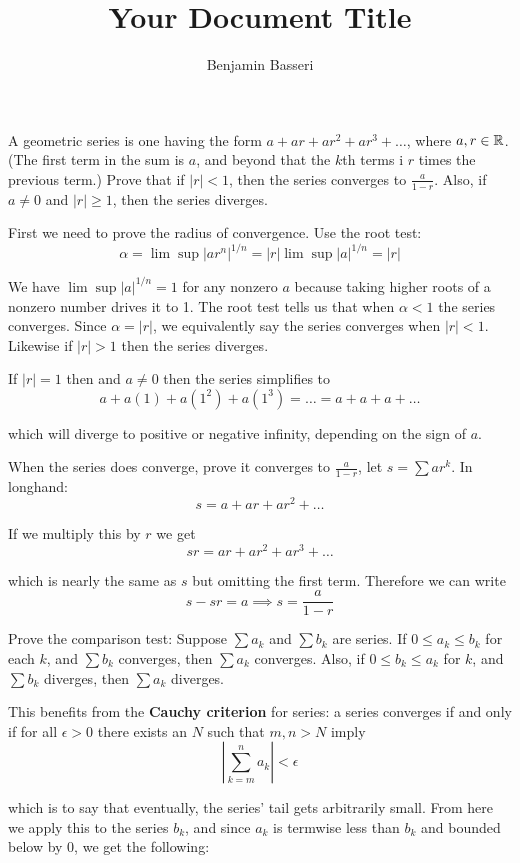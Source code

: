 \documentclass{article}
\title{Your Document Title}
\author{Benjamin Basseri}
\begin{document}
\maketitle
\begin{problem}
A geometric series is one having the form $a + ar + ar^2 + ar^3 + \ldots$, where $a, r \in \mathbb{R}$. (The first term in the sum is $a$, and beyond that the $k$th terms i $r$ times the previous term.) Prove that if $|r| < 1$, then the series converges to $\frac{a}{1 - r}$. Also, if $a \neq 0$ and $|r| \geq 1$, then the series diverges.
\end{problem}

First we need to prove the radius of convergence. Use the root test:
$$\alpha = \lim \sup |ar^n|^{1/n} = |r| \lim \sup |a|^{1/n} = |r|$$

We have $\lim \sup |a|^{1/n} = 1$ for any nonzero $a$ because taking higher roots of a nonzero number drives it to 1. The root test tells us that when $\alpha < 1$ the series converges. Since $\alpha = |r|$, we equivalently say the series converges when $|r| < 1$. Likewise if $|r| > 1$ then the series diverges.

If $|r| = 1$ then and $a \neq 0$ then the series simplifies to
$$a + a(1) + a(1^2) + a(1^3) = \ldots = a + a + a + \ldots$$

which will diverge to positive or negative infinity, depending on the sign of $a$.

When the series does converge, prove it converges to $\frac{a}{1 - r}$, let $s = \sum ar^k$. In longhand:
$$s = a + ar + ar^2 + \ldots$$

If we multiply this by $r$ we get
$$sr = ar + ar^2 + ar^3 + \ldots$$

which is nearly the same as $s$ but omitting the first term. Therefore we can write
$$s - sr = a \implies s = \frac{a}{1 - r}$$

\begin{problem}
Prove the comparison test: Suppose $\sum a_k$ and $\sum b_k$ are series. If $0 \leq a_k \leq b_k$ for each $k$, and $\sum b_k$ converges, then $\sum a_k$ converges. Also, if $0 \leq b_k \leq a_k$ for $k$, and $\sum b_k$ diverges, then $\sum a_k$ diverges.
\end{problem}

This benefits from the \textbf{Cauchy criterion} for series: a series converges if and only if for all $\epsilon > 0$ there exists an $N$ such that $m, n > N$ imply
$$\left|\sum_{k = m}^n a_k\right| < \epsilon$$

which is to say that eventually, the series' tail gets arbitrarily small. From here we apply this to the series $b_k$, and since $a_k$ is termwise less than $b_k$ and bounded below by 0, we get the following:
\end{document}
